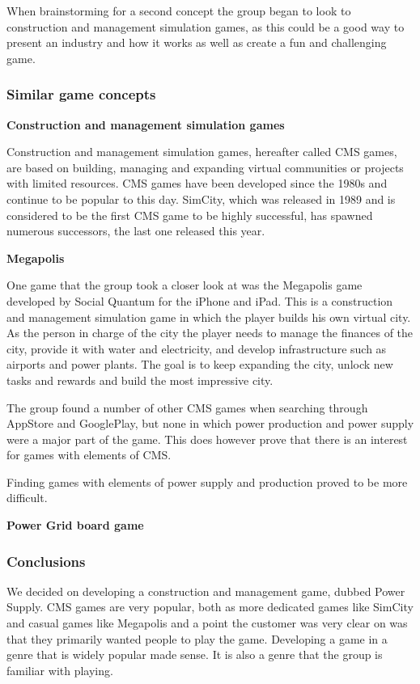 When brainstorming for a second concept the group began to look to construction
and management simulation games, as this could be a good way to present an
industry and how it works as well as create a fun and challenging game. 

\subsubsection{Similar game concepts}

{\bf Construction and management simulation games}

Construction and management simulation games, hereafter called CMS games, are
based on building, managing and expanding virtual communities or projects
with limited resources. CMS games have been developed since the 1980s and
continue to be popular to this day. SimCity, which was released in 1989 and
is considered to be the first CMS game to be highly successful, has spawned
numerous successors, the last one released this year.

{\bf Megapolis}

One game that the group took a closer look at was the Megapolis game developed
by Social Quantum for the iPhone and iPad. This is a construction and
management simulation game in which the player builds his own virtual city. As
the person in charge of the city the player needs to manage the finances of the
city, provide it with water and electricity, and develop infrastructure such as
airports and power plants. The goal is to keep expanding the city, unlock new
tasks and rewards and build the most impressive city.

The group found a number of other CMS games when searching through AppStore and
GooglePlay, but none in which power production and power supply were a major
part of the game. This does however prove that there is an interest for games
with elements of CMS.

Finding games with elements of power supply and production proved to be more
difficult.

{\bf Power Grid board game}

\subsubsection{Conclusions}

We decided on developing a construction and management game, dubbed Power Supply. CMS games are very popular, both as more dedicated games like SimCity and casual games like Megapolis and a point the customer was very clear on was that they primarily wanted people to play the game. Developing a game in a genre that is widely popular made sense. It is also a genre that the group is familiar with playing.
